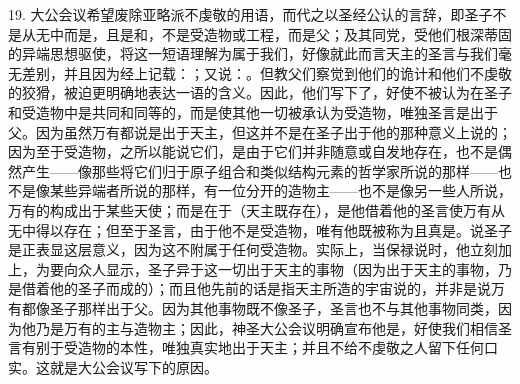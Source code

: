 19. 大公会议希望废除亚略派不虔敬的用语，而代之以圣经公认的言辞，即圣子不是从无中而是，且是和，不是受造物或工程，而是父；及其同党，受他们根深蒂固的异端思想驱使，将这一短语理解为属于我们，好像就此而言天主的圣言与我们毫无差别，并且因为经上记载：；又说：。但教父们察觉到他们的诡计和他们不虔敬的狡猾，被迫更明确地表达一语的含义。因此，他们写下了，好使不被认为在圣子和受造物中是共同和同等的，而是使其他一切被承认为受造物，唯独圣言是出于父。因为虽然万有都说是出于天主，但这并不是在圣子出于他的那种意义上说的；因为至于受造物，之所以能说它们，是由于它们并非随意或自发地存在，也不是偶然产生——像那些将它们归于原子组合和类似结构元素的哲学家所说的那样——也不是像某些异端者所说的那样，有一位分开的造物主——也不是像另一些人所说，万有的构成出于某些天使；而是在于（天主既存在），是他借着他的圣言使万有从无中得以存在；但至于圣言，由于他不是受造物，唯有他既被称为且真是。说圣子是正表显这层意义，因为这不附属于任何受造物。实际上，当保禄说时，他立刻加上，为要向众人显示，圣子异于这一切出于天主的事物（因为出于天主的事物，乃是借着他的圣子而成的）；而且他先前的话是指天主所造的宇宙说的，并非是说万有都像圣子那样出于父。因为其他事物既不像圣子，圣言也不与其他事物同类，因为他乃是万有的主与造物主；因此，神圣大公会议明确宣布他是，好使我们相信圣言有别于受造物的本性，唯独真实地出于天主；并且不给不虔敬之人留下任何口实。这就是大公会议写下的原因。\par

